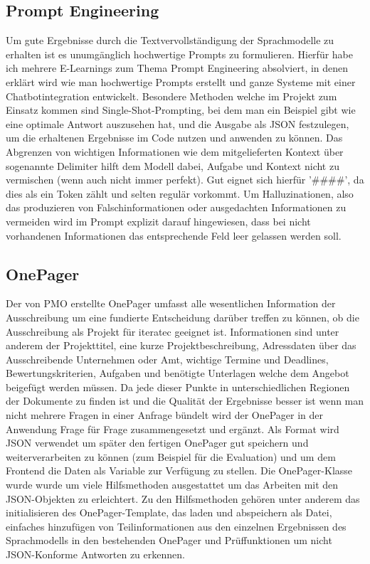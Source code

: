 \subsection{Prompt Engineering}
Um gute Ergebnisse durch die Textvervollständigung der Sprachmodelle zu erhalten ist es unumgänglich hochwertige Prompts zu formulieren.
Hierfür habe ich mehrere E-Learnings zum Thema Prompt Engineering absolviert, in denen erklärt wird wie man hochwertige Prompts erstellt und 
ganze Systeme mit einer Chatbotintegration entwickelt. Besondere Methoden welche im Projekt zum Einsatz kommen sind Single-Shot-Prompting, 
bei dem man ein Beispiel gibt wie eine optimale Antwort auszusehen hat, und die Ausgabe als JSON festzulegen, um die erhaltenen Ergebnisse 
im Code nutzen und anwenden zu können. Das Abgrenzen von wichtigen Informationen wie dem mitgelieferten Kontext über sogenannte Delimiter hilft
dem Modell dabei, Aufgabe und Kontext nicht zu vermischen (wenn auch nicht immer perfekt). Gut eignet sich hierfür '\#\#\#\#', da dies als 
ein Token zählt und selten regulär vorkommt. Um Halluzinationen, also das produzieren von Falschinformationen oder ausgedachten Informationen zu 
vermeiden wird im Prompt explizit darauf hingewiesen, dass bei nicht vorhandenen Informationen das entsprechende Feld leer gelassen werden soll. 

\subsection{OnePager}
Der von PMO erstellte OnePager umfasst alle wesentlichen Information der Ausschreibung um eine fundierte Entscheidung darüber treffen zu 
können, ob die Ausschreibung als Projekt für iteratec geeignet ist. Informationen sind unter anderem der Projekttitel, eine kurze Projektbeschreibung, 
Adressdaten über das Ausschreibende Unternehmen oder Amt, wichtige Termine und Deadlines, Bewertungskriterien, Aufgaben und benötigte Unterlagen welche 
dem Angebot beigefügt werden müssen. Da jede dieser Punkte in unterschiedlichen Regionen der Dokumente zu finden ist und die Qualität der Ergebnisse 
besser ist wenn man nicht mehrere Fragen in einer Anfrage bündelt wird der OnePager in der Anwendung Frage für Frage zusammengesetzt und ergänzt.
Als Format wird JSON verwendet um später den fertigen OnePager gut speichern und weiterverarbeiten zu können (zum Beispiel für die Evaluation) und um dem
Frontend die Daten als Variable zur Verfügung zu stellen. Die OnePager-Klasse wurde wurde um viele Hilfsmethoden ausgestattet um das Arbeiten mit den 
JSON-Objekten zu erleichtert. Zu den Hilfsmethoden gehören unter anderem das initialisieren des OnePager-Template, das laden und abspeichern als Datei, 
einfaches hinzufügen von Teilinformationen aus den einzelnen Ergebnissen des Sprachmodells in den bestehenden OnePager und Prüffunktionen um nicht 
JSON-Konforme Antworten zu erkennen.

